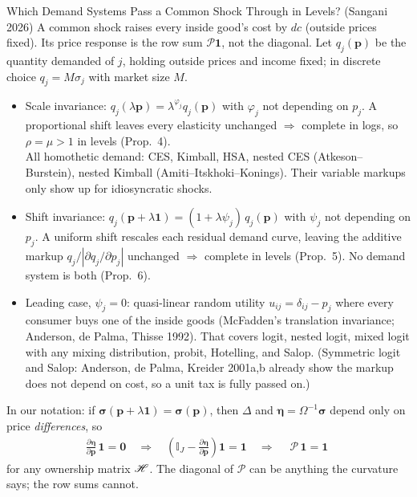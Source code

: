 \documentclass[aspectratio=169,10pt]{beamer}
\begin{document}
\begin{frame}{Which Demand Systems Pass a Common Shock Through in Levels? (Sangani 2026)}
\footnotesize
A \alert{common} shock raises every inside good's cost by $dc$ (outside prices fixed). Its price response is the \alert{row sum} $\mathcal{P}\symbf{1}$, not the diagonal. Let $q_j(\symbf{p})$ be the quantity demanded of $j$, holding outside prices and income fixed; in discrete choice $q_j = M \sigma_j$ with market size $M$.
\begin{itemize}
\item \alert{Scale invariance}: $q_j(\lambda \symbf{p}) = \lambda^{\varphi_j} q_j(\symbf{p})$ with $\varphi_j$ not depending on $p_j$. A proportional shift leaves every elasticity unchanged $\Rightarrow$ \alert{complete in logs}, so $\rho = \mu > 1$ in levels (Prop.\ 4).\\
All homothetic demand: CES, Kimball, HSA, nested CES (Atkeson--Burstein), nested Kimball (Amiti--Itskhoki--Konings). Their variable markups only show up for idiosyncratic shocks.
\item \alert{Shift invariance}: $q_j(\symbf{p} + \lambda \symbf{1}) = (1 + \lambda \psi_j)\, q_j(\symbf{p})$ with $\psi_j$ not depending on $p_j$. A uniform shift rescales each residual demand curve, leaving the additive markup $q_j / |\partial q_j / \partial p_j|$ unchanged $\Rightarrow$ \alert{complete in levels} (Prop.\ 5). No demand system is both (Prop.\ 6).
\item Leading case, $\psi_j = 0$: quasi-linear random utility $u_{ij} = \delta_{ij} - p_j$ where every consumer buys one of the inside goods (McFadden's translation invariance; Anderson, de Palma, Thisse 1992). That covers logit, nested logit, \alert{mixed logit with any mixing distribution}, probit, Hotelling, and Salop. (Symmetric logit and Salop: Anderson, de Palma, Kreider 2001a,b already show the markup does not depend on cost, so a unit tax is fully passed on.)
\end{itemize}
In our notation: if $\symbf{\sigma}(\symbf{p} + \lambda\symbf{1}) = \symbf{\sigma}(\symbf{p})$, then $\Delta$ and $\symbf{\eta} = \Omega^{-1}\symbf{\sigma}$ depend only on price \emph{differences}, so
\begin{align*}
\frac{\partial \symbf{\eta}}{\partial \symbf{p}}\, \symbf{1} = \symbf{0}
\quad\Rightarrow\quad
\left(\mathbb{I}_J - \frac{\partial \symbf{\eta}}{\partial \symbf{p}}\right)\symbf{1} = \symbf{1}
\quad\Rightarrow\quad
\boxed{\;\mathcal{P}\, \symbf{1} = \symbf{1}\;}
\end{align*}
for any ownership matrix $\mathscr{H}$. The diagonal of $\mathcal{P}$ can be anything the curvature says; the row sums cannot.
\end{frame}
\end{document}
